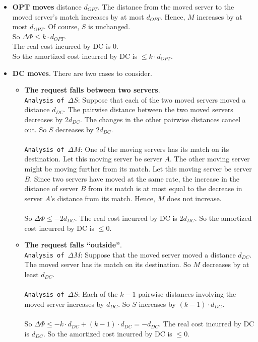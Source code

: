 \documentclass{article}
\begin{document}
\begin{itemize}
\item
{\bf OPT moves} distance $d_{OPT}$.
The distance from the moved server to the moved server's match
increases by at most $d_{OPT}$.
Hence, $M$ increases by at most $d_{OPT}$.
Of course, $S$ is unchanged.
\\
So $\Delta \Phi \le k \cdot d_{OPT}$.
\\
The real cost incurred by DC is $0$.
\\
So the amortized cost incurred by DC is $\le k\cdot d_{OPT}$.

\item
{\bf DC moves}. 
There are two cases to consider.
\begin{itemize}
\item
{\bf The request falls between two servers}.\\

\texttt{Analysis of $\Delta S$}: Suppose that each of the two moved servers moved a distance $d_{DC}$.
The pairwise distance between the two moved servers decreases by
$2d_{DC}$. The changes in the other pairwise distances cancel out.
So $S$ decreases by $2d_{DC}$.
\\\\
\texttt{Analysis of $\Delta M$}: One of the moving servers has its match on its destination. Let this moving server be server $A$. The other moving server might be moving further from its match. Let this moving server be server $B$. Since two servers have moved at the same rate, the increase in the distance of server $B$ from its match is at most equal to the decrease in server $A$'s distance from its match. Hence, $M$ does not increase. 
\\\\
So $\Delta \Phi \le -2d_{DC}$. The real cost incurred by DC is $2d_{DC}$. So the amortized cost incurred by DC is $\le 0$.
\\
\item
{\bf The request falls ``outside''}.\\

\texttt{Analysis of $\Delta M$}: Suppose that the moved server moved a distance $d_{DC}$.
The moved server has its match on its destination.
So $M$ decreases by at least $d_{DC}$.
\\\\
\texttt{Analysis of $\Delta S$}: Each of the $k-1$ pairwise distances involving the moved server
increases by $d_{DC}$. So $S$ increases by $(k-1)\cdot d_{DC}$.
\\\\
So $\Delta \Phi \le -k\cdot d_{DC}+(k-1)\cdot d_{DC} = -d_{DC}$. The real cost incurred by DC is $d_{DC}$. So the amortized cost incurred by DC is $\le 0$.
\end{itemize}
\end{itemize}
\end{document}
